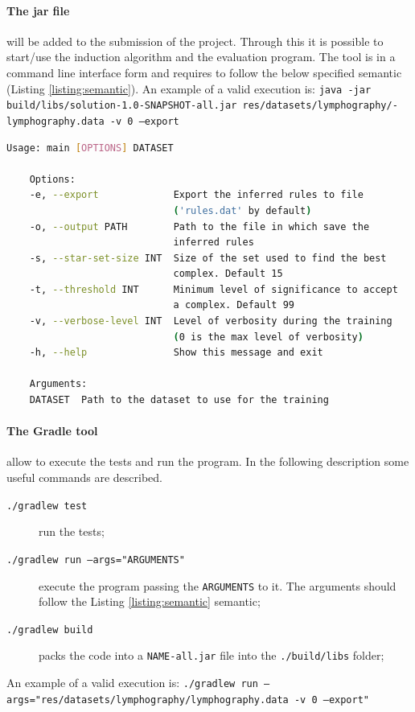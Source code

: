 \documentclass{article}
\begin{document}
\paragraph{The jar file} will be added to the submission of the project. Through this it is possible to start/use the induction algorithm and the evaluation program. The tool is in a command line interface form and requires to follow the below specified semantic (Listing \ref{listing:semantic}). An example of a valid execution is:
\vspace{6pt}\newline
\texttt{java -jar build/libs/solution-1.0-SNAPSHOT-all.jar res/datasets/lymphography/-\\lymphography.data -v 0 --export}
\begin{lstlisting}[language=bash,label={listing:semantic},caption={Semantic of the CLI program.},captionpos=b]
    Usage: main [OPTIONS] DATASET

    Options:
    -e, --export             Export the inferred rules to file
                             ('rules.dat' by default)
    -o, --output PATH        Path to the file in which save the
                             inferred rules
    -s, --star-set-size INT  Size of the set used to find the best
                             complex. Default 15
    -t, --threshold INT      Minimum level of significance to accept
                             a complex. Default 99
    -v, --verbose-level INT  Level of verbosity during the training
                             (0 is the max level of verbosity)
    -h, --help               Show this message and exit

    Arguments:
    DATASET  Path to the dataset to use for the training
\end{lstlisting}

\paragraph{The Gradle tool} allow to execute the tests and run the program. In the following description some useful commands are described.
\begin{description}
    \item[\texttt{./gradlew test}] run the tests;
    \item[\texttt{./gradlew run --args="ARGUMENTS"}] execute the program passing the \texttt{ARGUMENTS} to it. The arguments should follow the Listing \ref{listing:semantic} semantic;
    \item[\texttt{./gradlew build}] packs the code into a \texttt{NAME-all.jar} file into the \texttt{./build/libs} folder;
\end{description}
An example of a valid execution is:
\vspace{6pt}\newline
\texttt{./gradlew run --args="res/datasets/lymphography/lymphography.data -v 0 --export"}
\end{document}
